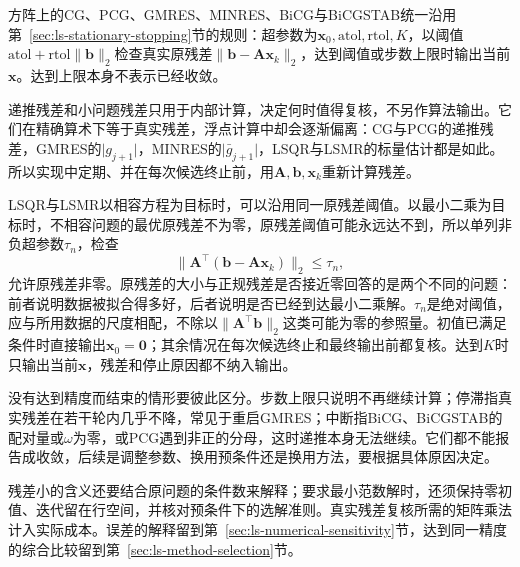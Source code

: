 方阵上的CG、PCG、GMRES、MINRES、BiCG与BiCGSTAB统一沿用第~\ref{sec:ls-stationary-stopping}节的规则：超参数为$\bm x_0,\mathrm{atol},\mathrm{rtol},K$，以阈值$\mathrm{atol}+\mathrm{rtol}\lVert\bm b\rVert_2$检查真实原残差$\lVert\bm b-\bm A\bm x_k\rVert_2$，达到阈值或步数上限时输出当前$\bm x$。达到上限本身不表示已经收敛。

递推残差和小问题残差只用于内部计算，决定何时值得复核，不另作算法输出。它们在精确算术下等于真实残差，浮点计算中却会逐渐偏离：CG与PCG的递推残差，GMRES的$\lvert g_{j+1}\rvert$，MINRES的$\lvert\bar g_{j+1}\rvert$，LSQR与LSMR的标量估计都是如此。所以实现中定期、并在每次候选终止前，用$\bm A,\bm b,\bm x_k$重新计算残差。

LSQR与LSMR以相容方程为目标时，可以沿用同一原残差阈值。以最小二乘为目标时，不相容问题的最优原残差不为零，原残差阈值可能永远达不到，所以单列非负超参数$\tau_n$，检查
\[
 \lVert\bm A^\top(\bm b-\bm A\bm x_k)\rVert_2\le\tau_n ,
\]
允许原残差非零。原残差的大小与正规残差是否接近零回答的是两个不同的问题：前者说明数据被拟合得多好，后者说明是否已经到达最小二乘解。$\tau_n$是绝对阈值，应与所用数据的尺度相配，不除以$\lVert\bm A^\top\bm b\rVert_2$这类可能为零的参照量。初值已满足条件时直接输出$\bm x_0=\bm0$；其余情况在每次候选终止和最终输出前都复核。达到$K$时只输出当前$\bm x$，残差和停止原因都不纳入输出。

没有达到精度而结束的情形要彼此区分。步数上限只说明不再继续计算；停滞指真实残差在若干轮内几乎不降，常见于重启GMRES；中断指BiCG、BiCGSTAB的配对量或$\omega$为零，或PCG遇到非正的分母，这时递推本身无法继续。它们都不能报告成收敛，后续是调整参数、换用预条件还是换用方法，要根据具体原因决定。

残差小的含义还要结合原问题的条件数来解释；要求最小范数解时，还须保持零初值、迭代留在行空间，并核对预条件下的选解准则。真实残差复核所需的矩阵乘法计入实际成本。误差的解释留到第~\ref{sec:ls-numerical-sensitivity}节，达到同一精度的综合比较留到第~\ref{sec:ls-method-selection}节。
